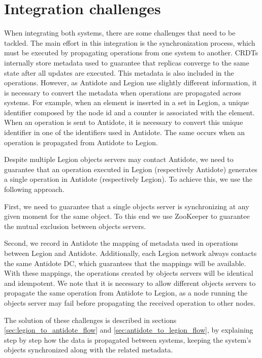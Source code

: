 \section{Integration challenges}
\label{sec:integration_challenges}
When integrating both systems, there are some challenges that need to be tackled. The main effort in this integration is the synchronization process, which must be executed by propagating operations from one system to another. CRDTs internally store metadata used to guarantee that replicas converge to the same state after all updates are executed. This metadata is also included in the operations. However, as Antidote and Legion use slightly different information, it is necessary to convert the metadata when operations are propagated across systems. For example, when an element is inserted in a set in Legion, a unique identifier composed by the node id and a counter is associated with the element. When an operation is sent to Antidote, it is necessary to convert this unique identifier in one of the identifiers used in Antidote. The same occurs when an operation is propagated from Antidote to Legion.\par
	Despite multiple Legion objects servers may contact Antidote, we need to guarantee that an operation executed in Legion (respectively Antidote) generates a single operation in Antidote (respectively Legion). To achieve this, we use the following approach.\par
	First, we need to guarantee that a single objects server is synchronizing at any given moment for the same object. To this end we use ZooKeeper to guarantee the mutual exclusion between objects servers.\par
	Second, we record in Antidote the mapping of metadata used in operations between Legion and Antidote. Additionally, each Legion network always contacts the same Antidote DC, which guarantees that the mappings will be available. With these mappings, the operations created by objects servers will be identical and idempotent. We note that it is necessary to allow different objects servers to propagate the same operation from Antidote to Legion, as a node running the objects server may fail before propagating the received operation to other nodes.\par
	The solution of these challenges is described in sections \ref{sec:legion_to_antidote_flow} and \ref{sec:antidote_to_legion_flow}, by explaining step by step how the data is propagated between systems, keeping the system's objects synchronized along with the related metadata.

